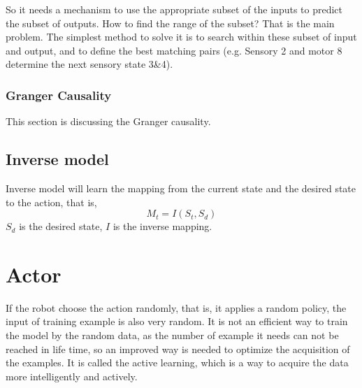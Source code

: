 \documentclass{article}
\begin{document}
So it needs a mechanism to use the appropriate subset of the inputs to predict the subset of outputs. How to find the range of the subset? That is the main problem. The simplest method to solve it is to search within these subset of input and output, and to define the best matching pairs (e.g. Sensory 2 and motor 8 determine the next sensory state 3\&4).

\subsubsection{Granger Causality}
\label{sec:grangercausality}

This section is discussing the Granger causality.


\subsection{Inverse model}
\label{sec:inversemodel}


Inverse model will learn the mapping from the current state and the desired state to the action, that is, 
\begin{equation}
  \label{eq:reversemodel}
  M_t = I(S_t,S_d)
\end{equation}
$S_d$ is the desired state, $I$ is the inverse mapping.


\section{Actor}
\label{sec:actor}
If the robot choose the action randomly, that is, it applies a random policy, the input of training example is also very random. It is not an efficient way to train the model by the random data, as the number of example it needs can not be reached in life time, so an improved way is needed to optimize the acquisition of the examples. It is called the active learning, which is a way to acquire the data more intelligently and actively.
\end{document}
